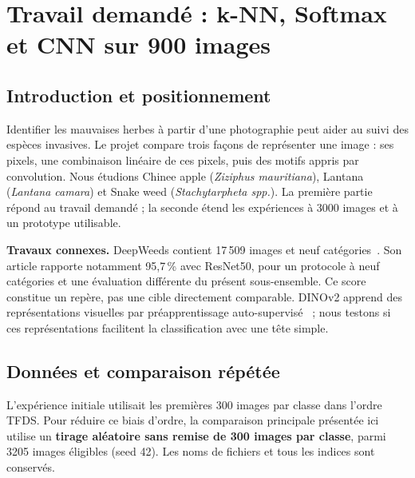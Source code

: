 \documentclass[10pt,a4paper]{article}
\newcommand{\pct}{\,\%\xspace}
\begin{document}
\section{Travail demandé : k-NN, Softmax et CNN sur 900 images}
\subsection{Introduction et positionnement}
Identifier les mauvaises herbes à partir d'une photographie peut aider au suivi des espèces
invasives. Le projet compare trois façons de représenter une image : ses pixels, une combinaison
linéaire de ces pixels, puis des motifs appris par convolution. Nous étudions Chinee apple
(\textit{Ziziphus mauritiana}), Lantana (\textit{Lantana camara}) et Snake weed
(\textit{Stachytarpheta spp.}). La première partie répond au travail demandé ; la seconde
étend les expériences à 3000 images et à un prototype utilisable.

\textbf{Travaux connexes.} DeepWeeds contient 17\,509 images et neuf catégories~\cite{deepweeds}.
Son article rapporte notamment 95,7\pct avec ResNet50, pour un protocole à neuf catégories
et une évaluation différente du présent sous-ensemble. Ce score constitue un repère, pas
une cible directement comparable. DINOv2 apprend des représentations visuelles par
préapprentissage auto-supervisé~\cite{dinov2} ; nous testons si ces représentations facilitent
la classification avec une tête simple.

\subsection{Données et comparaison répétée}
L'expérience initiale utilisait les premières 300 images par classe dans l'ordre TFDS.
Pour réduire ce biais d'ordre, la comparaison principale présentée ici utilise un
\textbf{tirage aléatoire sans remise de 300 images par classe}, parmi 3205 images éligibles
(seed 42). Les noms de fichiers et tous les indices sont conservés.
\end{document}
